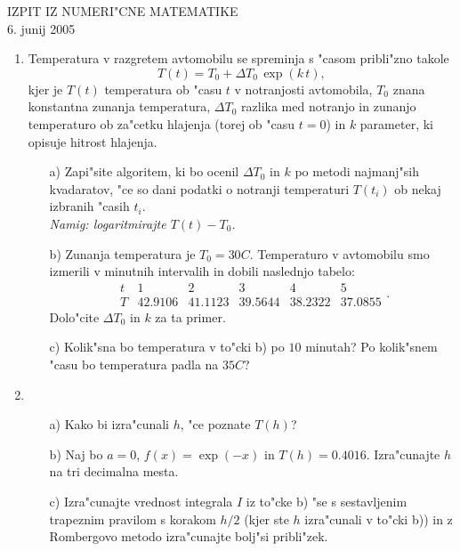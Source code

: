 

\begin{center}
  IZPIT IZ NUMERI"CNE MATEMATIKE\\
  6. junij 2005
\end{center}
\vspace{1cm}

\begin{enumerate}
  \item Temperatura v razgretem avtomobilu se spreminja s 
    "casom pribli"zno takole
    $$T(t)=T_0+\Delta T_0\,\exp(k\,t),$$
    kjer je $T(t)$ temperatura ob
    "casu $t$ v notranjosti avtomobila, $T_0$ znana konstantna zunanja
    temperatura, $\Delta T_0$ razlika med notranjo in zunanjo
    temperaturo ob za"cetku hlajenja (torej ob "casu $t=0$) in $k$
    parameter, ki opisuje hitrost hlajenja.
  \begin{itemize}
    \item[a)] Zapi"site algoritem, ki bo ocenil $\Delta T_0$ in $k$
      po metodi najmanj"sih kvadaratov, "ce so dani podatki o 
      notranji temperaturi $T(t_i)$ ob nekaj izbranih "casih $t_i$.\\
      {\sl Namig: logaritmirajte $T(t)-T_0$.}
    \item[b)] Zunanja temperatura je $T_0=30C$. Temperaturo v 
    avtomobilu smo izmerili v minutnih intervalih in dobili naslednjo
    tabelo:%
    $$
      \begin{array}{c|ccccc}
        t & 1 & 2 & 3 & 4 & 5\\ \hline
        T & 42.9106 & 41.1123 & 39.5644 & 38.2322 & 37.0855
      \end{array}.
    $$
    Dolo"cite $\Delta T_0$ in $k$ za ta primer.
    \item[c)] Kolik"sna bo temperatura v to"cki b) po $10$ minutah?
      Po kolik"snem "casu bo temperatura padla na $35C$?
  \end{itemize}
  \item 
    \begin{itemize}
      Integral $I=\int_{a}^{a+h} f(x)\,dx$ ra"cunamo z enostavnim
      trapeznim pravilom s korakom $h$, torej
      $$ I\approx T(h):=\frac{h}{2}\left(f(a)+f(a+h)\right).$$
     \item[a)] Kako bi izra"cunali $h$, "ce poznate $T(h)$?
     \item[b)] Naj bo $a=0$, $f(x)=\exp(-x)$ in $T(h)=0.4016$.
       Izra"cunajte $h$ na tri decimalna mesta.
     \item[c)] Izra"cunajte vrednost integrala $I$ iz to"cke b) "se s
       sestavljenim tra\-pez\-nim pravilom s korakom $h/2$ (kjer ste
       $h$ 
       izra"cunali v to"cki b)) in z Rombergovo metodo izra"cunajte
       bolj"si pribli"zek.
    \end{itemize}
\end{enumerate}



